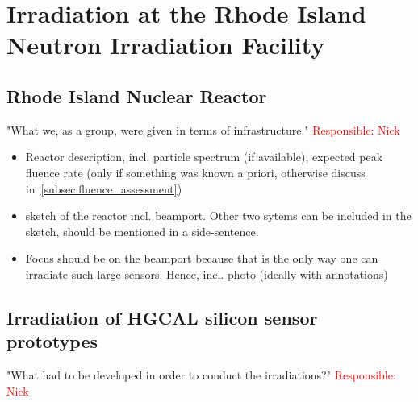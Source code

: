 \section{Irradiation at the Rhode Island Neutron Irradiation Facility}
\label{sec:irradiation}

\subsection{Rhode Island Nuclear Reactor}
\label{subsec:RINSC}
"What we, as a group, were given in terms of infrastructure." \textcolor{red}{Responsible: Nick}
\begin{itemize}
  \item Reactor description, incl. particle spectrum (if available), expected peak fluence rate (only if something was known a priori, otherwise discuss in~\ref{subsec:fluence_assessment})
  \item sketch of the reactor incl. beamport. Other two sytems can be included in the sketch, should be mentioned in a side-sentence.
  \item Focus should be on the beamport because that is the only way one can irradiate such large sensors. Hence, incl. photo (ideally with annotations)
\end{itemize}

\subsection{Irradiation of HGCAL silicon sensor prototypes}
\label{subsec:irradiation}
"What had to be developed in order to conduct the irradiations?" \textcolor{red}{Responsible: Nick}

